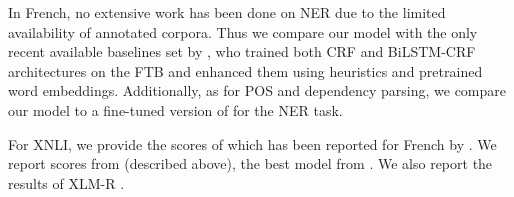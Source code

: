 
In French, no extensive work has been done on NER due to the limited availability of annotated corpora. Thus we compare our model with the only recent available baselines set by \citet{dupont-2017-exploration}, who trained both CRF \citep{lafferty-etal-2001-conditional} and BiLSTM-CRF \citep{lample-etal-2016-neural} architectures on the FTB and enhanced them using heuristics and pretrained word embeddings. Additionally, as for POS and dependency parsing, we compare our model to a fine-tuned version of \mbert for the NER task.

For XNLI, we provide the scores of \mbert which has been reported for French by \citet{wu-dredze-2019-beto}.
We report scores from \xlmmlmtlm (described above), the best model from \citet{conneau-lample-2019-cross}. %
We also report the results of \mbox{XLM-R} \cite{conneau-etal-2020-unsupervised}.


